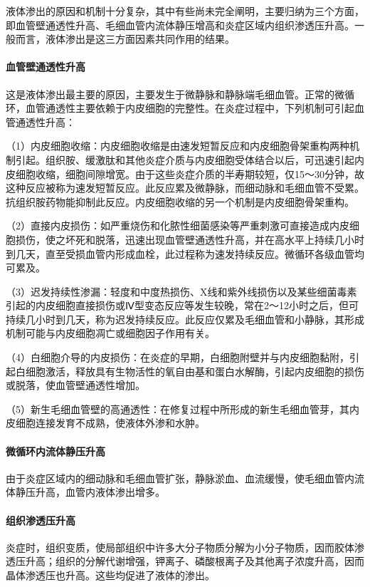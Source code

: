 液体渗出的原因和机制十分复杂，其中有些尚未完全阐明，主要归纳为三个方面，即血管壁通透性升高、毛细血管内流体静压增高和炎症区域内组织渗透压升高。一般而言，液体渗出是这三方面因素共同作用的结果。

\paragraph{血管壁通透性升高}
这是液体渗出最主要的原因，主要发生于微静脉和静脉端毛细血管。正常的微循环，血管通透性主要依赖于内皮细胞的完整性。在炎症过程中，下列机制可引起血管通透性升高：

（1）内皮细胞收缩：内皮细胞收缩是由速发短暂反应和内皮细胞骨架重构两种机制引起。组织胺、缓激肽和其他炎症介质与内皮细胞受体结合以后，可迅速引起内皮细胞收缩，细胞间隙增宽。由于这些炎症介质的半寿期较短，仅15～30分钟，故这种反应被称为速发短暂反应。此反应累及微静脉，而细动脉和毛细血管不受累。抗组织胺药物能抑制此反应。内皮细胞收缩的另一个机制是内皮细胞骨架重构。

（2）直接内皮损伤：如严重烧伤和化脓性细菌感染等严重刺激可直接造成内皮细胞损伤，使之坏死和脱落，迅速出现血管壁通透性升高，并在高水平上持续几小时到几天，直至受损血管内形成血栓，此过程称为速发持续反应。微循环各级血管均可累及。

（3）迟发持续性渗漏：轻度和中度热损伤、X线和紫外线损伤以及某些细菌毒素引起的内皮细胞直接损伤或Ⅳ型变态反应等发生较晚，常在2～12小时之后，但可持续几小时到几天，称为迟发持续反应。此反应仅累及毛细血管和小静脉，其形成机制可能与内皮细胞凋亡或细胞因子作用有关。

（4）白细胞介导的内皮损伤：在炎症的早期，白细胞附壁并与内皮细胞黏附，引起白细胞激活，释放具有生物活性的氧自由基和蛋白水解酶，引起内皮细胞的损伤或脱落，使血管壁通透性增加。

（5）新生毛细血管壁的高通透性：在修复过程中所形成的新生毛细血管芽，其内皮细胞连接发育不成熟，使液体外渗和水肿。

\paragraph{微循环内流体静压升高}
由于炎症区域内的细动脉和毛细血管扩张，静脉淤血、血流缓慢，使毛细血管内流体静压升高，血管内液体渗出增多。

\paragraph{组织渗透压升高}
炎症时，组织变质，使局部组织中许多大分子物质分解为小分子物质，因而胶体渗透压升高；组织的分解代谢增强，钾离子、磷酸根离子及其他离子浓度升高，因而晶体渗透压也升高。这些均促进了液体的渗出。

